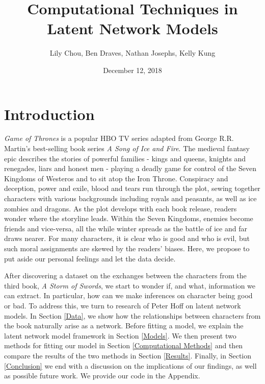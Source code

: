 \documentclass{article}
\title{Computational Techniques in Latent Network Models}
\author{Lily Chou, Ben Draves, Nathan Josephs, Kelly Kung}
\date{December 12, 2018}
\begin{document}
\maketitle

\section{Introduction}

\textit{Game of Thrones} is a popular HBO TV series adapted from George R.R. Martin's best-selling book series \textit{A Song of Ice and Fire}. The medieval fantasy epic describes the stories of powerful families - kings and queens, knights and renegades, liars and honest men - playing a deadly game for control of the Seven Kingdoms of Westeros and to sit atop the Iron Throne. Conspiracy and deception, power and exile, blood and tears run through the plot, sewing together characters with various backgrounds including royals and peasants, as well as ice zombies and dragons. As the plot develops with each book release, readers wonder where the storyline leads. Within the Seven Kingdoms, enemies become friends and vice-versa, all the while winter spreads as the battle of ice and far draws nearer. For many characters, it is clear who is good and who is evil, but such moral assignments are skewed by the readers' biases. Here, we propose to put aside our personal feelings and let the data decide.

After discovering a dataset on the exchanges between the characters from the third book, \textit{A Storm of Swords}, we start to wonder if, and what, information we can extract. In particular, how can we make inferences on character being good or bad. To address this, we turn to research of Peter Hoff on latent network models. In Section \ref{Data}, we show how the relationships between characters from the book naturally arise as a network. Before fitting a model, we explain the latent network model framework in Section \ref{Models}. We then present two methods for fitting our model in Section \ref{Computational Methods} and then compare the results of the two methods in Section \ref{Results}. Finally, in Section \ref{Conclusion} we end with a discussion on the implications of our findings, as well as possible future work. We provide our code in the Appendix.
\end{document}

